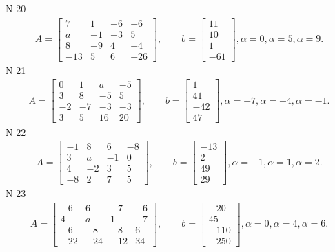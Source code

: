 \documentclass[11pt]{report}
\begin{document}
N 20
\begin{align*}
 A = \left[\begin{matrix}7 & 1 & -6 & -6\\a & -1 & -3 & 5\\8 & -9 & 4 & -4\\-13 & 5 & 6 & -26\end{matrix}\right],
    \qquad b = \left[\begin{matrix}11\\10\\1\\-61\end{matrix}\right], \alpha = 0, \alpha = 5, \alpha = 9. 
 \end{align*}
N 21
\begin{align*}
 A = \left[\begin{matrix}0 & 1 & a & -5\\3 & 8 & -5 & 5\\-2 & -7 & -3 & -3\\3 & 5 & 16 & 20\end{matrix}\right],
    \qquad b = \left[\begin{matrix}1\\41\\-42\\47\end{matrix}\right], \alpha = -7, \alpha = -4, \alpha = -1. 
 \end{align*}
N 22
\begin{align*}
 A = \left[\begin{matrix}-1 & 8 & 6 & -8\\3 & a & -1 & 0\\4 & -2 & 3 & 5\\-8 & 2 & 7 & 5\end{matrix}\right],
    \qquad b = \left[\begin{matrix}-13\\2\\49\\29\end{matrix}\right], \alpha = -1, \alpha = 1, \alpha = 2. 
 \end{align*}
N 23
\begin{align*}
 A = \left[\begin{matrix}-6 & 6 & -7 & -6\\4 & a & 1 & -7\\-6 & -8 & -8 & 6\\-22 & -24 & -12 & 34\end{matrix}\right],
    \qquad b = \left[\begin{matrix}-20\\45\\-110\\-250\end{matrix}\right], \alpha = 0, \alpha = 4, \alpha = 6. 
 \end{align*}
\end{document}
